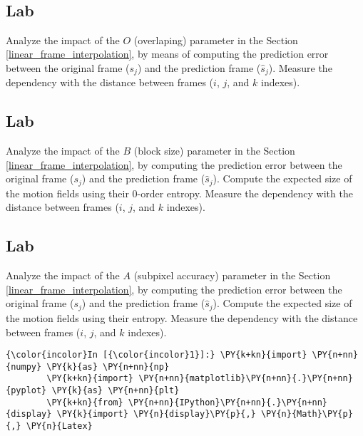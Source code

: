 {\begin{enumerate}
    \begin{center}
    \end{center}
    { \hspace*{\fill} \\}
    
    \hypertarget{lab}{%
\subsection{Lab}\label{lab}}

Analyze the impact of the \(O\) (overlaping) parameter in the
Section \ref{linear_frame_interpolation}, by means of computing the
prediction error between the original frame (\(s_j\)) and the prediction
frame (\(\hat{s}_j\)). Measure the dependency with the distance between
frames (\(i\), \(j\), and \(k\) indexes).

    \hypertarget{lab}{%
\subsection{Lab}\label{lab}}

Analyze the impact of the \(B\) (block size) parameter in the
Section \ref{linear_frame_interpolation}, by computing the prediction
error between the original frame (\(s_j\)) and the prediction frame
(\(\hat{s}_j\)). Compute the expected size of the motion fields using
their 0-order entropy. Measure the dependency with the distance between
frames (\(i\), \(j\), and \(k\) indexes).

    \hypertarget{lab}{%
\subsection{Lab}\label{lab}}

Analyze the impact of the \(A\) (subpixel accuracy) parameter in the
Section \ref{linear_frame_interpolation}, by computing the prediction
error between the original frame (\(s_j\)) and the prediction frame
(\(\hat{s}_j\)). Compute the expected size of the motion fields using
their entropy. Measure the dependency with the distance between frames
(\(i\), \(j\), and \(k\) indexes).

    \begin{Verbatim}[commandchars=\\\{\}]
{\color{incolor}In [{\color{incolor}1}]:} \PY{k+kn}{import} \PY{n+nn}{numpy} \PY{k}{as} \PY{n+nn}{np}
        \PY{k+kn}{import} \PY{n+nn}{matplotlib}\PY{n+nn}{.}\PY{n+nn}{pyplot} \PY{k}{as} \PY{n+nn}{plt}
        \PY{k+kn}{from} \PY{n+nn}{IPython}\PY{n+nn}{.}\PY{n+nn}{display} \PY{k}{import} \PY{n}{display}\PY{p}{,} \PY{n}{Math}\PY{p}{,} \PY{n}{Latex}
        

\end{Verbatim}
\end{enumerate}}
